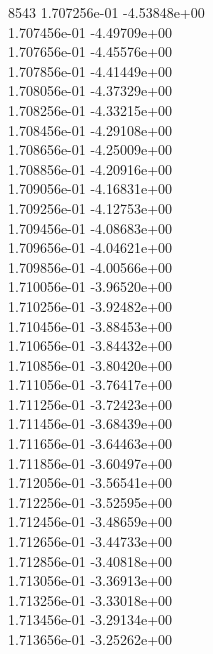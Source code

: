 8543	1.707256e-01	-4.53848e+00	\\ 	1.707456e-01	-4.49709e+00	\\ 	1.707656e-01	-4.45576e+00	\\ 	1.707856e-01	-4.41449e+00	\\ 	1.708056e-01	-4.37329e+00	\\ 	1.708256e-01	-4.33215e+00	\\ 	1.708456e-01	-4.29108e+00	\\ 	1.708656e-01	-4.25009e+00	\\ 	1.708856e-01	-4.20916e+00	\\ 	1.709056e-01	-4.16831e+00	\\ 	1.709256e-01	-4.12753e+00	\\ 	1.709456e-01	-4.08683e+00	\\ 	1.709656e-01	-4.04621e+00	\\ 	1.709856e-01	-4.00566e+00	\\ 	1.710056e-01	-3.96520e+00	\\ 	1.710256e-01	-3.92482e+00	\\ 	1.710456e-01	-3.88453e+00	\\ 	1.710656e-01	-3.84432e+00	\\ 	1.710856e-01	-3.80420e+00	\\ 	1.711056e-01	-3.76417e+00	\\ 	1.711256e-01	-3.72423e+00	\\ 	1.711456e-01	-3.68439e+00	\\ 	1.711656e-01	-3.64463e+00	\\ 	1.711856e-01	-3.60497e+00	\\ 	1.712056e-01	-3.56541e+00	\\ 	1.712256e-01	-3.52595e+00	\\ 	1.712456e-01	-3.48659e+00	\\ 	1.712656e-01	-3.44733e+00	\\ 	1.712856e-01	-3.40818e+00	\\ 	1.713056e-01	-3.36913e+00	\\ 	1.713256e-01	-3.33018e+00	\\ 	1.713456e-01	-3.29134e+00	\\ 	1.713656e-01	-3.25262e+00	\\ \hline
